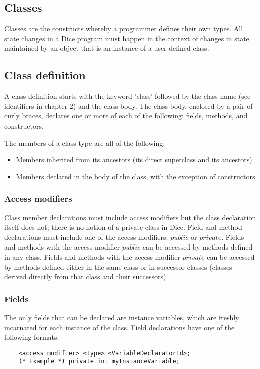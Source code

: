 \begin{homeworkProblem}
	\chapter{Classes}
	
	Classes are the constructs whereby a programmer defines their own types. All state changes in a Dice program must happen in the context of changes in state maintained by an object that is an instance of a user-defined class.
	
	\section{Class definition}
	A class definition starts with the keyword 'class' followed by the class name (see identifiers in chapter 2) and the class body. The class body, enclosed by a pair of curly braces, declares one or more of each of the following: fields, methods, and constructors.
	
	The members of a class type are all of the following:
	\begin{itemize}
		\item Members inherited from its ancestors (its direct superclass and its ancestors)
		\item Members declared in the body of the class, with the exception of constructors
	\end{itemize}
	
	\subsection{Access modifiers}
	Class member declarations must include access modifiers but the class declaration itself does not; there is no notion of a private class in Dice. Field and method declarations must include one of the access modifiers: $public$ or $private$. Fields and methods with the access modifier $public$ can be accessed by methods defined in any class. Fields and methods with the access modifier $private$ can be accessed by methods defined either in the same class or in successor classes (classes derived directly from that class and their successors).
	
	\subsection{Fields}
	The only fields that can be declared are instance variables, which are freshly incarnated for each instance of the class.
	Field declarations have one of the following formats:
	\begin{verbatim}
	<access modifier> <type> <VariableDeclaratorId>;
	(* Example *) private int myInstanceVariable;
	

\end{verbatim}
\end{homeworkProblem}
